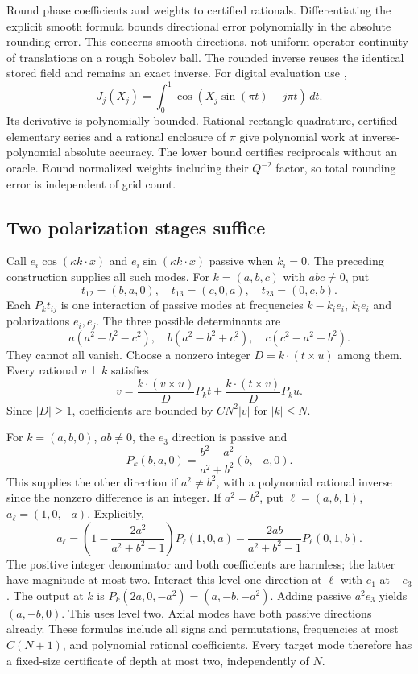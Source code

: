 \documentclass[11pt,a4paper]{amsart}
\theoremstyle{definition}
\theoremstyle{remark}
\numberwithin{equation}{section}
\begin{document}
Round phase coefficients and weights to certified rationals. Differentiating
the explicit smooth formula bounds directional error polynomially in the
absolute rounding error. This concerns smooth directions, not uniform
operator continuity of translations on a rough Sobolev ball. The rounded
inverse reuses the identical stored field and remains an exact inverse.
For digital evaluation use \cite[10.9.2]{DLMF},
\[
 J_j(X_j)=\int_0^1\cos(X_j\sin(\pi t)-j\pi t)\,dt.
\]
Its derivative is polynomially bounded. Rational rectangle quadrature,
certified elementary series and a rational enclosure of $\pi$ give
polynomial work at inverse-polynomial absolute accuracy. The lower bound
certifies reciprocals without an oracle. Round normalized weights including
their $Q^{-2}$ factor, so total rounding error is independent of grid count.

\subsection{Two polarization stages suffice}\label{cmp:polarization}

Call $e_i\cos(\kappa k\cdot x)$ and $e_i\sin(\kappa k\cdot x)$ passive
when $k_i=0$. The preceding construction supplies all such modes.
For $k=(a,b,c)$ with $abc\ne0$, put
\[
 t_{12}=(b,a,0),\quad t_{13}=(c,0,a),\quad t_{23}=(0,c,b).
\]
Each $P_kt_{ij}$ is one interaction of passive modes at frequencies
$k-k_i e_i$, $k_i e_i$ and polarizations $e_i,e_j$.
The three possible determinants are
\[
 a(a^2-b^2-c^2),\quad b(a^2-b^2+c^2),\quad
 c(c^2-a^2-b^2).
\]
They cannot all vanish. Choose a nonzero integer $D=k\cdot(t\times u)$
among them. Every rational $v\perp k$ satisfies
\begin{equation}
 v=\frac{k\cdot(v\times u)}D P_kt+
   \frac{k\cdot(t\times v)}D P_ku.\label{cmp:polarization-solve}
\end{equation}
Since $|D|\ge1$, coefficients are bounded by $CN^2|v|$ for $|k|\le N$.

For $k=(a,b,0)$, $ab\ne0$, the $e_3$ direction is passive and
\[
 P_k(b,a,0)=\frac{b^2-a^2}{a^2+b^2}(b,-a,0).
\]
This supplies the other direction if $a^2\ne b^2$, with a polynomial
rational inverse since the nonzero difference is an integer.
If $a^2=b^2$, put $\ell=(a,b,1)$, $a_\ell=(1,0,-a)$. Explicitly,
\[
 a_\ell=\left(1-\frac{2a^2}{a^2+b^2-1}\right)P_\ell(1,0,a)
 -\frac{2ab}{a^2+b^2-1}P_\ell(0,1,b).
\]
The positive integer denominator and both coefficients are harmless; the
latter have magnitude at most two. Interact this level-one direction at
$\ell$ with $e_1$ at $-e_3$. The output at $k$ is
$P_k(2a,0,-a^2)=(a,-b,-a^2)$. Adding passive $a^2e_3$ yields $(a,-b,0)$.
This uses level two. Axial modes have both passive directions already.
These formulas include all signs and permutations, frequencies at most
$C(N+1)$, and polynomial rational coefficients. Every target mode therefore
has a fixed-size certificate of depth at most two, independently of $N$.
\end{document}
